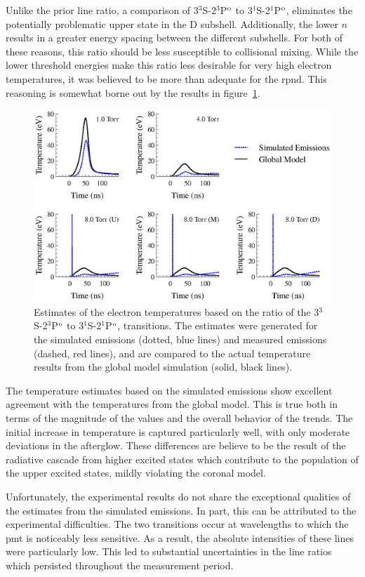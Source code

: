 Unlike the prior line ratio, a comparison of 3$^3$S-2$^3$P$^\mathrm{o}$ to
3$^1$S-2$^1$P$^\mathrm{o}$, eliminates the potentially problematic upper state in the D
subshell. Additionally, the lower $n$ results in a greater energy spacing
between the different subshells. For both of these reasons, this ratio should be
less susceptible to collisional mixing. While the lower threshold energies make
this ratio less desirable for very high electron temperatures, it was believed
to be more than adequate for the \acs{rpnd}. This reasoning is somewhat borne
out by the results in figure~\ref{fig:rat1comp}.
\begin{figure}
  \centering
  \includegraphics{./chapters/emissions/figures/rat1comp.eps}
  \caption{Estimates of the electron temperatures based on the ratio of the
    3$^3$S-2$^3$P$^\mathrm{o}$ to 3$^1$S-2$^1$P$^\mathrm{o}$, transitions. The estimates were
    generated for the simulated emissions (dotted, blue lines) and measured
    emissions (dashed, red lines), and are compared to the actual temperature
    results from the global model simulation (solid, black lines).}
  \label{fig:rat1comp}
\end{figure}
The temperature estimates based on the simulated emissions show excellent
agreement with the temperatures from the global model. This is true both in
terms of the magnitude of the values and the overall behavior of the trends. The
initial increase in temperature is captured particularly well, with only
moderate deviations in the afterglow. These differences are believe to be the
result of the radiative cascade from higher excited states which contribute to
the population of the upper excited states, mildly violating the coronal model.

Unfortunately, the experimental results do not share the exceptional qualities
of the estimates from the simulated emissions. In part, this can be attributed
to the experimental difficulties. The two transitions occur at wavelengths to
which the \acs{pmt} is noticeably less sensitive. As a result, the absolute
intensities of these lines were particularly low. This led to substantial
uncertainties in the line ratios which persisted throughout the measurement
period.

